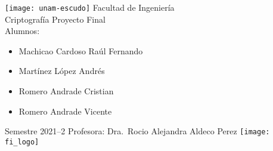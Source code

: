 \begin{titlepage}
  \centering
  \texttt{[image: unam-escudo]}\vfill{}
  \Huge{Facultad de Ingeniería}\\
  \huge{Criptografía}\vfill{}
  \Huge{Proyecto Final}
  \\
  \vfill{}
  \LARGE{Alumnos:}
  \begin{flushleft}
    \begin{itemize}
      \item Machicao Cardoso Raúl Fernando
      \item Martínez López Andrés
      \item Romero Andrade Cristian
      \item Romero Andrade Vicente
    \end{itemize}
  \end{flushleft}
  \vfill{}
  \Large{Semestre 2021--2}
  \vfill{}
  \LARGE{Profesora: Dra.~Rocio Alejandra Aldeco Perez}
  \vfill
  \texttt{[image: fi\_logo]}
\end{titlepage}
